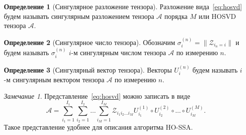 \documentclass[specialist,
    substylefile = spbu_report.rtx,
    subf,href,colorlinks=true, 12pt]{disser}
\theoremstyle{plain}
\theoremstyle{definition}
\newtheorem{definition}{Определение}[section]
\theoremstyle{remark}
\newtheorem*{remark}{Замечание}
\begin{document}
    \begin{definition}[Сингулярное разложение тензора]
        \label{def:hosvd}
        Разложение вида~\eqref{eq:hosvd} будем называть сингулярным разложением тензора $\mathcal{A}$ порядка $M$ или
        HOSVD тензора $\mathcal{A}$.
    \end{definition}
    \begin{definition}[Сингулярное число тензора]
        \label{def:singular-value}
        Обозначим $\sigma_i^{(n)}=\|\mathcal Z_{i_n=i}\|$ и будем называть $\sigma_i^{(n)}$ $i$-м сингулярным числом
        тензора $\mathcal A$ по измерению $n$.
    \end{definition}
    \begin{definition}[Сингулярный вектор тензора]
        \label{def:singular-tensor}
        Векторы $U_i^{(n)}$ будем называть $i$-м сингулярным вектором тензора $\mathcal A$ по измерению $n$.
    \end{definition}
    \begin{remark}
        Представление~\eqref{eq:hosvd} можно записать в виде
        \begin{equation}
            \mathcal{A}=\sum_{i_1=1}^{I_1} \sum_{i_2=1}^{I_2}\ldots \sum_{i_M=1}^{I_M} \mathcal{Z}_{i_1 i_2 \ldots i_M}
            U^{(1)}_{i_1} \circ U^{(2)}_{i_2} \circ \ldots\circ U^{(M)}_{i_M}.\label{eq:sum-hosvd}
        \end{equation}
        Такое представление удобнее для описания алгоритма HO-SSA\@.
    \end{remark}
\end{document}
